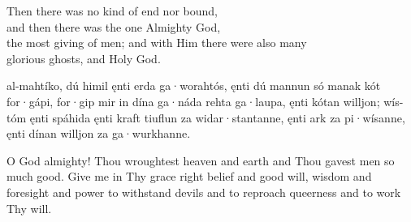 \bvb%
Then there was no kind of end nor bound, \\
and then there was the one Almighty God, \\
the most giving of men; and with Him there were also many \\
glorious ghosts, and Holy God.\evb\evg


\bpg\bpa {} al-mahtíko, dú himil ęnti erda ga·worahtós, ęnti dú mannun só manak kót for·gápi,
for·gip mir in dína ga·náda rehta ga·laupa, ęnti kótan willjon; wís-tóm ęnti spáhida ęnti kraft tiuflun za widar·stantanne, ęnti ark za pi·wísanne, ęnti dínan willjon za ga·wurkhanne.\epa

\bpb O God almighty! Thou wroughtest heaven and earth and Thou gavest men so much good.
Give me in Thy grace right belief and good will, wisdom and foresight and power to withstand devils and to reproach queerness and to work Thy will.\epb\epg

\sectionline
